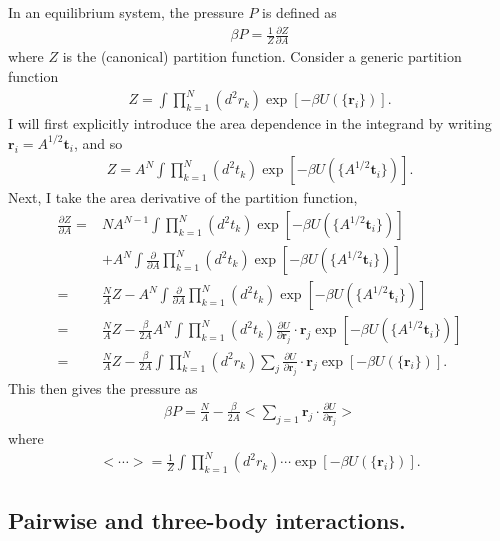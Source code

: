 \documentclass[../main.tex]{subfiles}
\begin{document}
In an equilibrium system, the pressure $P$ is defined as
\begin{align}
  \beta P = \frac{1}{Z}\frac{\partial Z}{\partial A}
\end{align}
where $Z$ is the (canonical) partition function. Consider a generic
partition function
\begin{align}
  Z=\int\prod_{k=1}^N(d^2r_k)\exp[-\beta U(\{\bm{r}_i\})].
\end{align}
I will first explicitly introduce the area dependence in the integrand by
writing $\bm{r}_i = A^{1/2}\bm{t}_i$, and so
\begin{align}
  Z = A^N\int\prod_{k=1}^N(d^2t_k)\exp[-\beta U(\{A^{1/2}\bm{t}_i\})].
\end{align}
Next, I take the area derivative of the partition function,
\begin{align}
  \frac{\partial Z}{\partial A}
  =&NA^{N-1}\int\prod_{k=1}^N(d^2t_k)\exp[-\beta U(\{A^{1/2}\bm{t}_i\})]
  \nonumber\\
  &+A^N\int\frac{\partial}{\partial A}\prod_{k=1}^N(d^2t_k)
  \exp[-\beta U(\{A^{1/2}\bm{t}_i\})]\nonumber\\
  =&\frac{N}{A}Z
  -A^N\int\frac{\partial}{\partial A}\prod_{k=1}^N(d^2t_k)
  \exp[-\beta U(\{A^{1/2}\bm{t}_i\})]\nonumber\\
  =&\frac{N}{A}Z
  -\frac{\beta}{2A}A^N\int\prod_{k=1}^N(d^2t_k)
  \frac{\partial U}{\partial\bm{r}_j}\cdot
  \bm{r}_j\exp[-\beta U(\{A^{1/2}\bm{t}_i\})]\nonumber\\
  =&\frac{N}{A}Z
  -\frac{\beta}{2A}\int\prod_{k=1}^N(d^2r_k)
  \sum_{j}\frac{\partial U}{\partial\bm{r}_j}\cdot
  \bm{r}_j\exp[-\beta U(\{\bm{r}_i\})].
\end{align}
This then gives the pressure as
\begin{align}
  \beta P = \frac{N}{A}
  -\frac{\beta}{2A}\bigg<\sum_{j=1}\bm{r}_j\cdot
  \frac{\partial U}{\partial\bm{r}_j}\bigg>
\end{align}
where
\begin{align}
  <\cdots> = \frac{1}{Z}
  \int\prod_{k=1}^N(d^2r_k)
  \cdots\exp[-\beta U(\{\bm{r}_i\})].
\end{align}

\subsection{Pairwise and three-body interactions.\label{app:onlytwobody}}
\end{document}
